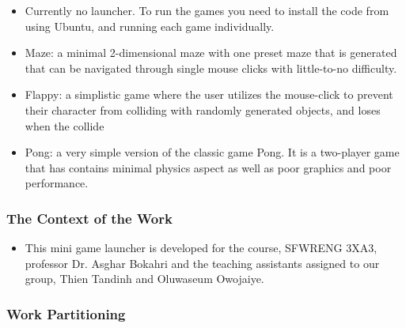 \documentclass[12pt, titlepage]{article}
\begin{document}
\begin{itemize}
    \item Currently no launcher. To run the games you need to install the code from using Ubuntu, and running each game individually.
    \item Maze: a minimal 2-dimensional maze with one preset maze that is generated that can be navigated through single mouse clicks with little-to-no difficulty.
    \item Flappy: a simplistic game where the user utilizes the mouse-click to prevent their character from colliding with randomly generated objects, and loses when the collide
    \item Pong: a very simple version of the classic game Pong. It is a two-player game that has contains minimal physics aspect as well as poor graphics and poor performance.
\end{itemize}

\subsubsection{The Context of the Work}
\begin{itemize}
    \item This mini game launcher is developed for the course, SFWRENG 3XA3, professor Dr. Asghar Bokahri and the teaching assistants assigned to our group, Thien Tandinh and Oluwaseum Owojaiye.
\end{itemize}
\subsubsection{Work Partitioning}

\begin{table}[H]
\caption{Work Partitioning Events}
\begin{center}
\setlength{\tabcolsep}{3pt}
\end{center}
\label{wpe}
\end{table}%
\end{document}
